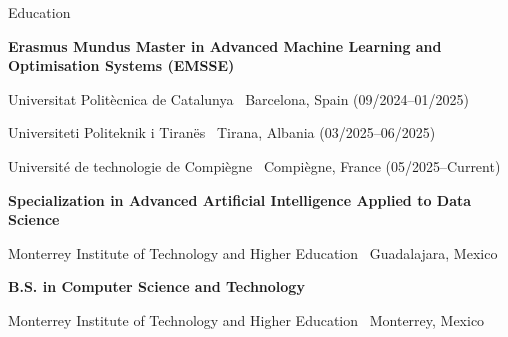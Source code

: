 \begin{rubric}{Education}

\entry*[09/2024 -- Current]
  \textbf{Erasmus Mundus Master in Advanced Machine Learning and Optimisation Systems (EMSSE)}\par
  Universitat Polit{\`e}cnica de Catalunya \textbar\ Barcelona, Spain (09/2024--01/2025)\par
  Universiteti Politeknik i Tiran{\"e}s \textbar\ Tirana, Albania (03/2025--06/2025)\par
  Universit{\'e} de technologie de Compi{\`e}gne \textbar\ Compi{\`e}gne, France (05/2025--Current)

\entry*[08/2023 -- 12/2024]
  \textbf{Specialization in Advanced Artificial Intelligence Applied to Data Science}\par
  Monterrey Institute of Technology and Higher Education \textbar\ Guadalajara, Mexico

\entry*[08/2021 -- 06/2024]
  \textbf{B.S. in Computer Science and Technology}\par
  Monterrey Institute of Technology and Higher Education \textbar\ Monterrey, Mexico

\end{rubric}
